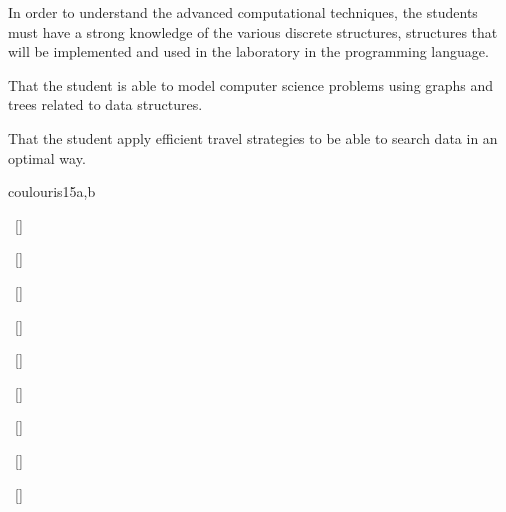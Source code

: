 \begin{syllabus}


\begin{justification}
In order to understand the advanced computational techniques, the students must have a strong knowledge of the
various discrete structures, structures that will be implemented and used in the laboratory in the programming language.
\end{justification}

\begin{goals}
\item That the student is able to model computer science problems using graphs and trees related to data structures.
\item That the student apply efficient travel strategies to be able to search data in an optimal way.
\end{goals}



\begin{unit}{\PDDistributedSystems}{}{coulouris}{15}{a,b}
\begin{topics}%
    \item \PDDistributedSystemsTopicFaults
    \item \PDDistributedSystemsTopicDistributed
    \item \PDDistributedSystemsTopicDistributedSystem
    \item \PDDistributedSystemsTopicDistributedService
    \item \PDDistributedSystemsTopicCore
\end{topics}
\begin{learningoutcomes}%
    \item \PDDistributedSystemsLODistinguishNetwork~[\Familiarity] %
    \item \PDDistributedSystemsLOExplainWhySuch~[\Familiarity] %
    \item \PDDistributedSystemsLOWriteAPerforms~[\Usage] %
    \item \PDDistributedSystemsLOMeasure~[\Usage] %
    \item \PDDistributedSystemsLOExplainWhySystem~[\Familiarity] %
    \item \PDDistributedSystemsLOImplementAForSpell~[\Usage] %
    \item \PDDistributedSystemsLOExplainTheOverhead~[\Familiarity] %
    \item \PDDistributedSystemsLODescribeTheAssociated~[\Familiarity] %
    \item \PDDistributedSystemsLOGiveExamplesFor~[\Usage] %
\end{learningoutcomes}%
\end{unit}


\end{syllabus}
